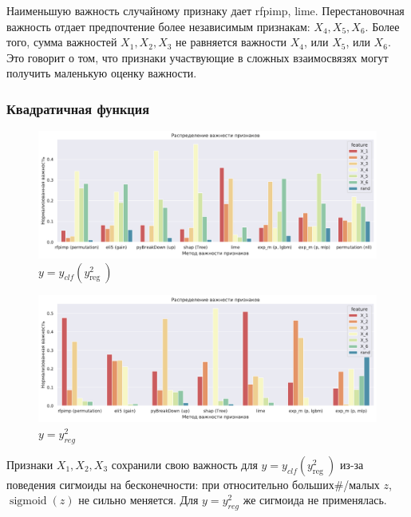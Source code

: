 \documentclass[12pt]{article}
\begin{document}
Наименьшую важность случайному признаку дает rfpimp, lime. Перестановочная важность отдает предпочтение более независимым признакам: $X_4, X_5, X_6$. Более того, сумма важностей $X_1, X_2, X_3$ не равняется важности $X_4$, или $X_5$, или $X_6$. Это говорит о том, что признаки участвующие в сложных взаимосвязях могут получить маленькую оценку важности.

\newpage
\subsubsection{Квадратичная функция}
\begin{figure}[h]
\centering
\includegraphics[width=\textwidth]{images/at2_setup2.pdf}
\caption{$y=y_{clf}\left(y_{\text {reg }}^{2}\right)$}
\end{figure}

\begin{figure}[h]
\centering
\includegraphics[width=\textwidth]{images/at2_setup4.pdf}
\caption{$y=y_{reg}^{2}$}
\end{figure}

Признаки $X_1, X_2, X_3$ сохранили свою важность для $y=y_{clf}\left(y_{\text {reg }}^{2}\right)$ из-за поведения сигмоиды на бесконечности: при относительно больших#/малых $z$, $\operatorname{sigmoid}(z)$ не сильно меняется. Для $y=y_{reg}^{2}$ же сигмоида не применялась.

\newpage
\end{document}
